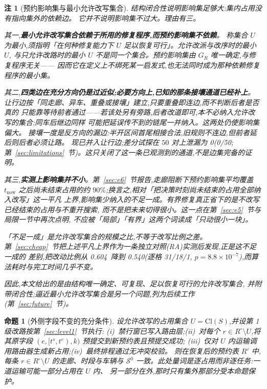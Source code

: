 \documentclass[manuscript,screen,review]{acmart}
\newcommand{\NPairs}{50}
\newcommand{\ResFracCheapRtwo}{0.540}
\newcommand{\ResFracAllFuture}{0.604}
\newcommand{\RAStabWTL}{31/18/1}     %
\newcommand{\RAStabP}{8.8\times10^{-7}}  %
\newcommand{\ProbeLeakPairs}{0/50}
\newcommand{\ProbeLeaks}{0}
\newtheorem{remark}{注}
\newtheorem{prop}{命题}
\begin{document}
\begin{remark}[预约影响集与最小允许改写集合]
\label{rem:minimality}
结构闭合性说明影响集足够大:集内占用没有指向集外的依赖边。
它并不说明影响集不过大。理由有三。

其一,\textbf{最小允许改写集合依赖于所用的修复程序,而预约影响集不依赖}。
称集合 \(U\) 为最小,须指明「在何种修复能力下 \(U\) 足以恢复可行」。允许改派与改序时的最小 \(U\),
与只允许改路时的最小 \(U\) 不是同一个集合。预约影响集由 \(G_R\) 唯一确定,与修复程序无关——
因而它在定义上不绑死某一启发式,也无法同时成为那种依赖修复程序的最小集。

其二,\textbf{四类边在充分方向仍是过近似;必要方向上,已知的那条接壤通道已经补上}。
让行边按「同走廊、异车、重叠或接壤」建立,只要重叠即连边,而不判断后者是否\emph{真的}
只能靠等待前者通过——若该处另有旁路,后者改道即可,本不必纳入允许改写的集合;同车后继边同样
可能把延误传不到的链尾一并纳入。这两处仍使影响集偏大。
接壤一度是反方向的漏边:半开区间首尾相接合法,旧规则不连边,但前者延后则后者必须让路。
现已并入让行边;差分试探在 \(\NPairs\) 对上泄漏为 \ProbeLeaks(\ProbeLeakPairs;
第~\ref{sec:limitations}~节)。这只关闭了这一条已观测到的通道,不是边集完备的证明。

其三,\textbf{实测上影响集并不小}。第~\ref{sec:e6}~节报告,走廊阻断下预约影响集平均覆盖
\(t_{\mathrm{now}}\) 之后尚未结束占用的约 \(90\%\);换言之,相对「把决策时刻尚未结束的占用全部纳入改写」这一平凡
上界,影响集少纳入的不足一成。有界修复真正省下的是\emph{不改写已经结束的占用}与\emph{不重开搜索},
而不是把未来切得很小。这一点在第~\ref{sec:e5}~节与局限一节中再次点明,
不应被「局部」「有界」这两个词读成「只动很小一块」。

「不足一成」是允许改写集合的\emph{规模}之比,不等于改写比例之差。
第~\ref{sec:cheap}~节把上述平凡上界作为一条独立对照(RA)实测后发现,正是这不足一成的
差别,把改动比例从 \ResFracAllFuture\ 降到 \ResFracCheapRtwo(逐格 \RAStabWTL,
\(p=\RAStabP\)),而算法耗时与完工时间几乎不变。

因此,本文给出的是由结构唯一确定、可复现、\emph{足以}恢复可行的允许改写集合,
并附带闭合性;逼近最小允许改写集合是另一个问题,列为后续工作
(第~\ref{sec:future}~节)。
\end{remark}

\begin{prop}[外侧字段不变的充分条件]
\label{prop:outside}
设允许改写的占用集合 \(U=\mathrm{Cl}(S)\),并设第 1 级改路按第~\ref{sec:level1}~节执行:
(i)~禁行窗已写入路由层;(ii)~对每个 \(r\in R^{\circ}\setminus U\),将其原字段
\((e,[t^s,t^e),k)\) 预提交到新预约表且预提交成功;
(iii)~仅对 \(U\) 内运输调用路由器生成新占用;(iv)~最终排程通过无冲突校验。
则在恢复后的预约表 \(R'\) 中,每条 \(r\in R^{\circ}\setminus U\) 的走廊、时段与车辆与
\(\mathcal{S}^0\) 一致。此处量词是逐\emph{占用}而非逐任务:一道运输可能一部分占用在 \(U\) 内、
另一部分在外,那时只有集外那部分受本命题保护。
\end{prop}
\end{document}
